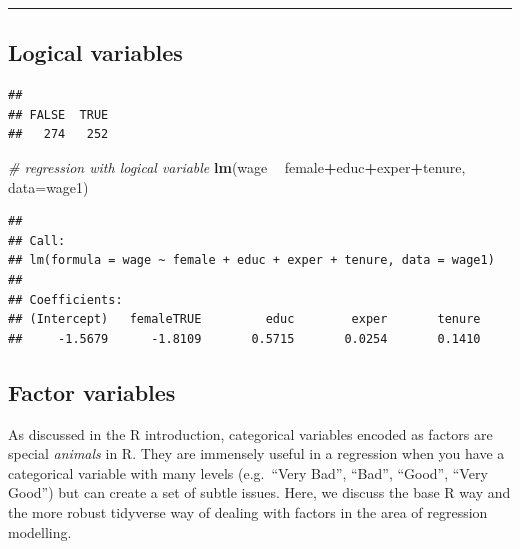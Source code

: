 \documentclass[]{book}
\newenvironment{Shaded}{\begin{snugshade}}{\end{snugshade}}
\newcommand{\CommentTok}[1]{\textcolor[rgb]{0.56,0.35,0.01}{\textit{#1}}}
\newcommand{\DataTypeTok}[1]{\textcolor[rgb]{0.13,0.29,0.53}{#1}}
\newcommand{\KeywordTok}[1]{\textcolor[rgb]{0.13,0.29,0.53}{\textbf{#1}}}
\newcommand{\NormalTok}[1]{#1}
\newcommand{\OperatorTok}[1]{\textcolor[rgb]{0.81,0.36,0.00}{\textbf{#1}}}
\newcommand{\StringTok}[1]{\textcolor[rgb]{0.31,0.60,0.02}{#1}}
\begin{document}
\begin{center}\rule{0.5\linewidth}{\linethickness}\end{center}

\hypertarget{logical-variables}{%
\subsection{Logical variables}\label{logical-variables}}

\begin{Shaded}
\end{Shaded}

\begin{verbatim}
## 
## FALSE  TRUE 
##   274   252
\end{verbatim}

\begin{Shaded}
\begin{Highlighting}[]
\CommentTok{# regression with logical variable}
\KeywordTok{lm}\NormalTok{(wage }\OperatorTok{~}\StringTok{ }\NormalTok{female}\OperatorTok{+}\NormalTok{educ}\OperatorTok{+}\NormalTok{exper}\OperatorTok{+}\NormalTok{tenure, }\DataTypeTok{data=}\NormalTok{wage1)}
\end{Highlighting}
\end{Shaded}

\begin{verbatim}
## 
## Call:
## lm(formula = wage ~ female + educ + exper + tenure, data = wage1)
## 
## Coefficients:
## (Intercept)   femaleTRUE         educ        exper       tenure  
##     -1.5679      -1.8109       0.5715       0.0254       0.1410
\end{verbatim}

\hypertarget{factor-variables}{%
\subsection{Factor variables}\label{factor-variables}}

As discussed in the R introduction, categorical variables encoded as factors are special \emph{animals} in R. They are immensely useful in a regression when you have a categorical variable with many levels (e.g.~``Very Bad'', ``Bad'', ``Good'', ``Very Good'') but can create a set of subtle issues. Here, we discuss the base R way and the more robust tidyverse way of dealing with factors in the area of regression modelling.
\end{document}
